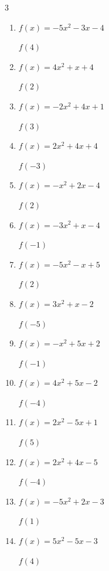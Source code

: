 \begin{multicols}{3}
\begin{enumerate}
  \item $f(x)=-5x^{2}-3x-4$

$f(4)$
        \phantom{$= -96$}

\columnbreak %

  \item $f(x)=4x^{2}+x+4$

$f(2)$
        \phantom{$= 22$}

  \item $f(x)=-2x^{2}+4x+1$

$f(3)$
        \phantom{$= -5$}

  \item $f(x)=2x^{2}+4x+4$

$f(-3)$
        \phantom{$= 10$}

  \item $f(x)=-x^{2}+2x-4$

$f(2)$
        \phantom{$= -4$}

  \item $f(x)=-3x^{2}+x-4$

$f(-1)$
        \phantom{$= -8$}

  \item $f(x)=-5x^{2}-x+5$

$f(2)$
        \phantom{$= -17$}

  \item $f(x)=3x^{2}+x-2$

$f(-5)$
        \phantom{$= 68$}

  \item $f(x)=-x^{2}+5x+2$

$f(-1)$
        \phantom{$= -4$}

  \item $f(x)=4x^{2}+5x-2$

$f(-4)$
        \phantom{$= 42$}

  \item $f(x)=2x^{2}-5x+1$

$f(5)$
        \phantom{$= 26$}

  \item $f(x)=2x^{2}+4x-5$

$f(-4)$
        \phantom{$= 11$}

  \item $f(x)=-5x^{2}+2x-3$

$f(1)$
        \phantom{$= -6$}

  \item $f(x)=5x^{2}-5x-3$

$f(4)$
        \phantom{$= 57$}


\end{enumerate}
\end{multicols}
